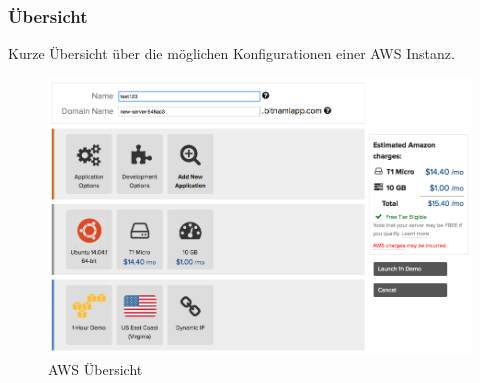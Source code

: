 \subsubsection{Übersicht}
Kurze Übersicht über die möglichen Konfigurationen einer AWS Instanz.
\begin{figure}[!htbp]
  \includegraphics[width=\textwidth]{./03_Analyse/03_Bitnami/images/aws_overview}
  \caption{AWS Übersicht}
\end{figure}

